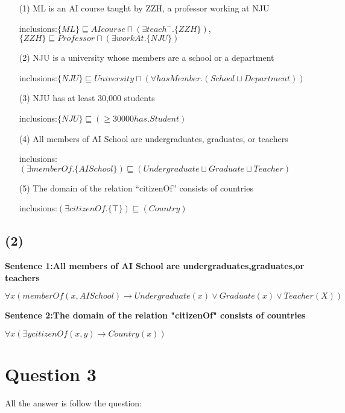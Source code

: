 \documentclass{article}
\begin{document}
	\begin{enumerate}
		\item[(1)] ML is an AI course taught by ZZH, a professor working at NJU
		
		inclusions:$\{ML\} \sqsubseteq AIcourse \sqcap (\exists teach^-.\{ZZH\})$,$\{ZZH\} \sqsubseteq Professor \sqcap (\exists workAt.\{NJU\})$ 

		\item[(2)] NJU is a university whose members are a school or a department
		
		inclusions:$\{NJU\} \sqsubseteq University \sqcap (\forall hasMember.(School \sqcup Department))$
		
		\item[(3)] NJU has at least 30,000 students

		inclusions:$\{NJU\} \sqsubseteq (\geq 30000 has.Student)$

		\item[(4)] All members of AI School are undergraduates, graduates, or teachers
		
		inclusions:$(\exists memberOf.\{AI School\}) \sqsubseteq (Undergraduate \sqcup Graduate \sqcup Teacher)$
		
		\item[(5)] The domain of the relation ``citizenOf'' consists of countries
		
		inclusions:$(\exists citizenOf.\{\top\}) \sqsubseteq (Country)$
	
	\end{enumerate}

	\subsection{(2)}

		\textbf{Sentence 1:All members of AI School are undergraduates,graduates,or teachers}

		$\forall x (memberOf(x, AI School) \to Undergraduate(x) \lor Graduate(x) \lor Teacher(X))$

		\textbf{Sentence 2:The domain of the relation "citizenOf" consists of countries}

		$\forall x (\exists y citizenOf(x,y) \to Country(x))$

	\section{Question 3}
 
	All the answer is follow the question:
\end{document}

